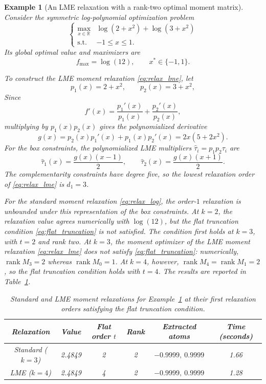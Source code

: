\documentclass[pdflatex,sn-mathphys-num]{sn-jnl}%
\newcommand{\st}{\mathrm{s.t.}}
\theoremstyle{thmstyleone}%
\theoremstyle{thmstyletwo}%
\newtheorem{example}{Example}%
\theoremstyle{thmstylethree}%
\begin{document}
{\color{red}
\begin{example}[An LME relaxation with a rank-two optimal moment matrix]
\label{ex:lme_rank_two}
Consider the symmetric log-polynomial optimization problem
\[
\left\{
\begin{array}{cl}
\displaystyle\max_{x\in\mathbb{R}}
& \log(2+x^2)+\log(3+x^2)\\
\st & -1\leq x\leq 1.
\end{array}
\right.
\]
Its global optimal value and maximizers are
\[
f_{\max}=\log(12),
\qquad x^*\in\{-1,1\}.
\]

To construct the LME moment relaxation \eqref{eq:relax_lme}, let
\[
p_1(x)=2+x^2,\qquad p_2(x)=3+x^2,
\]
Since
\[
f'(x)=\frac{p_1'(x)}{p_1(x)}+\frac{p_2'(x)}{p_2(x)},
\]
multiplying by $p_1(x)p_2(x)$ gives the polynomialized derivative
\[
g(x)
=p_2(x)p_1'(x)+p_1(x)p_2'(x)
=2x(5+2x^2).
\]
For the box constraints, the polynomialized LME multipliers
$\widehat{\tau}_i=p_1p_2\tau_i$ are
\[
\widehat{\tau}_1(x)=\frac{g(x)(x-1)}{2},
\qquad
\widehat{\tau}_2(x)=\frac{g(x)(x+1)}{2}.
\]
The complementarity constraints have degree five, so the lowest
relaxation order of \eqref{eq:relax_lme} is $d_1=3$.

For the standard moment relaxation \eqref{eq:relax_log}, the order-$1$
relaxation is unbounded under this representation of the box constraints.
At $k=2$, the relaxation value agrees numerically with $\log(12)$, but
the flat truncation condition \eqref{eq:flat_truncation} is not satisfied.
The condition first holds at $k=3$, with $t=2$ and rank two. At $k=3$,
the moment optimizer of the LME moment relaxation \eqref{eq:relax_lme} does not satisfy
\eqref{eq:flat_truncation}: numerically,
$\operatorname{rank}M_3=2$ whereas $\operatorname{rank}M_0=1$.
At $k=4$, however,
$\operatorname{rank}M_4=\operatorname{rank}M_1=2$, so the flat
truncation condition holds with $t=4$.
The results are reported in Table~\ref{tab:lme_rank_two}.
\begin{table}[htb]
\centering
\caption{Standard and LME moment relaxations for
Example~\ref{ex:lme_rank_two} at their first relaxation orders
satisfying the flat truncation condition.}
\label{tab:lme_rank_two}
\begin{tabular}{|c|c|c|c|c|c|}
\hline
Relaxation
& Value
& Flat order $t$
& Rank
& Extracted atoms
& Time (seconds)\\
\hline
Standard ($k=3$)
& 2.4849
& 2
& 2
& $-0.9999,\ 0.9999$
& 1.66\\
\hline
LME ($k=4$)
& 2.4849
& 4
& 2
& $-0.9999,\ 0.9999$
& 1.28\\
\hline
\end{tabular}
\end{table}


\end{example}}
\end{document}

